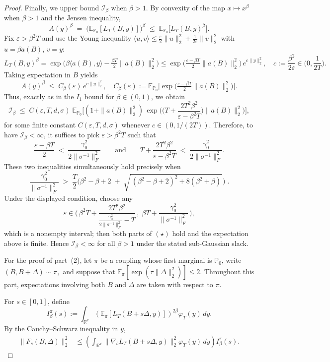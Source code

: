 \documentclass[10pt,a4paper]{amsart}
\newcommand{\E}{\mathbb{E}}
\newcommand{\R}{\mathbb{R}}
\begin{document}
\begin{proof}
Finally, we upper bound $\mathcal I_\beta$ when $\beta > 1$.
By convexity of the map $x \mapsto x^{\beta}$ when $\beta > 1$ and the Jensen inequality, 
\[
A(y)^{\beta}\;=\;\big(\mathbb E_{\mathbb P_0}[L_T(B,y)]\big)^{\beta}\;\le\;\mathbb E_{\mathbb P_0}\!\big[L_T(B,y)^{\beta}\big].
\]
Fix \(\varepsilon>\beta^2 T\) and use the Young inequality
\(\langle u,v\rangle\le \tfrac{\varepsilon}{2}\|u\|_2^2+\tfrac{1}{2\varepsilon}\|v\|_2^2\) with \(u=\beta a(B)\), \(v=y\):
\[
L_T(B,y)^{\beta}
=\exp\!\Big(\beta\langle a(B),y\rangle-\tfrac{\beta T}{2}\|a(B)\|_2^2\Big)
\le \exp\!\Big(\tfrac{\varepsilon-\beta T}{2}\|a(B)\|_2^2\Big)\,e^{c\|y\|_2^2},
\quad c:=\frac{\beta^2}{2\varepsilon}\in\Big(0,\frac{1}{2T}\Big).
\]
Taking expectation in \(B\) yields
\[
A(y)^{\beta}\;\le\;C_{\beta}(\varepsilon)\,e^{c\|y\|_2^2},
\quad
C_{\beta}(\varepsilon):=
\mathbb E_{\mathbb P_0}\!\Big[\exp\!\Big(\tfrac{\varepsilon-\beta T}{2}\|a(B)\|_2^2\Big)\Big].
\]
Thus, exactly as in the \(I_1\) bound for \(\beta\in(0,1)\), we obtain 
\[
\mathcal I_\beta
\;\le\;C(\varepsilon,T,d,\sigma)\;
\mathbb E_{\mathbb P_0}\!\Big[(1+\|a(B)\|_2^2)\,
\exp\!\Big(\Big(T+\frac{2T^2\beta^2}{\varepsilon-\beta^2T}\Big)\|a(B)\|_2^2\Big)\Big],
\]
for some finite constant \(C(\varepsilon,T,d,\sigma)\) whenever \(c\in(0,1/(2T))\).
Therefore, to have \(\mathcal I_\beta<\infty\), it suffices to pick \(\varepsilon>\beta^2T\) such that
\[
\frac{\varepsilon-\beta T}{2}\;<\;\frac{\gamma_0^2}{2\|\sigma^{-1}\|_F^2}
\qquad\text{and}\qquad
T+\frac{2T^2\beta^2}{\varepsilon-\beta^2T}\;<\;\frac{\gamma_0^2}{2\|\sigma^{-1}\|_F^2}.
\tag{$\star$}
\]
These two inequalities simultaneously hold precisely when
\[
\frac{\gamma_0^2}{\|\sigma^{-1}\|_F^2}\;>\;\frac{T}{2}\Big(\beta^2-\beta+2
\;+\;\sqrt{\,(\beta^2-\beta+2)^{2}+8(\beta^2+\beta)\,}\Big)\;.
\]
Under the displayed condition, choose any
\[
\varepsilon\in\Big(\,\beta^2T+\frac{2T^2\beta^2}{\frac{\gamma_0^2}{2\|\sigma^{-1}\|_F^2}-T}\,,\;\beta T+\frac{\gamma_0^2}{\|\sigma^{-1}\|_F^2}\,\Big),
\]
which is a nonempty interval; then both parts of \((\star)\) hold and the expectation above is finite. Hence \(\mathcal I_\beta<\infty\) for all \(\beta>1\) under the stated sub-Gaussian slack.

For the proof of part~(2), let $\pi$ be a coupling whose first marginal
is $\mathbb P_0$, write $(B,B+\Delta)\sim\pi,$
and suppose that $\E_\pi
\left[
\exp\!\left(\tau\|\Delta\|_2^2\right)
\right]
\leq 2.$
Throughout this part, expectations involving both $B$ and $\Delta$ are
taken with respect to $\pi$.

For $s\in[0,1]$, define
\[
I_\beta^\pi(s)
:=
\int_{\R^d}
\left(
\E_\pi[L_T(B+s\Delta,y)]
\right)^{2\beta}
\varphi_T(y)\,dy.
\]
By the Cauchy--Schwarz inequality in $y$,
\begin{align}
\|F_s(B,\Delta)\|_2^2
&\leq
\left(
\int_{\R^d}
\|\nabla_bL_T(B+s\Delta,y)\|_2^2
\varphi_T(y)\,dy
\right)
I_\beta^\pi(s).
\label{eq:Fs-two-factors}
\end{align}


\end{proof}
\end{document}
